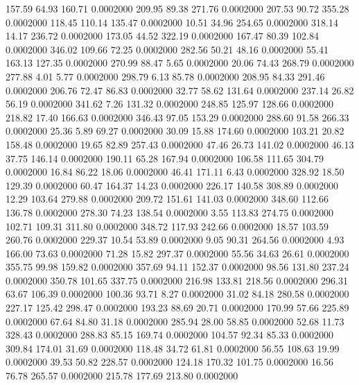  157.59   64.93  160.71   0.0002000
 209.95   89.38  271.76   0.0002000
 207.53   90.72  355.28   0.0002000
 118.45  110.14  135.47   0.0002000
  10.51   34.96  254.65   0.0002000
 318.14   14.17  236.72   0.0002000
 173.05   44.52  322.19   0.0002000
 167.47   80.39  102.84   0.0002000
 346.02  109.66   72.25   0.0002000
 282.56   50.21   48.16   0.0002000
  55.41  163.13  127.35   0.0002000
 270.99   88.47    5.65   0.0002000
  20.06   74.43  268.79   0.0002000
 277.88    4.01    5.77   0.0002000
 298.79    6.13   85.78   0.0002000
 208.95   84.33  291.46   0.0002000
 206.76   72.47   86.83   0.0002000
  32.77   58.62  131.64   0.0002000
 237.14   26.82   56.19   0.0002000
 341.62    7.26  131.32   0.0002000
 248.85  125.97  128.66   0.0002000
 218.82   17.40  166.63   0.0002000
 346.43   97.05  153.29   0.0002000
 288.60   91.58  266.33   0.0002000
  25.36    5.89   69.27   0.0002000
  30.09   15.88  174.60   0.0002000
 103.21   20.82  158.48   0.0002000
  19.65   82.89  257.43   0.0002000
  47.46   26.73  141.02   0.0002000
  46.13   37.75  146.14   0.0002000
 190.11   65.28  167.94   0.0002000
 106.58  111.65  304.79   0.0002000
  16.84   86.22   18.06   0.0002000
  46.41  171.11    6.43   0.0002000
 328.92   18.50  129.39   0.0002000
  60.47  164.37   14.23   0.0002000
 226.17  140.58  308.89   0.0002000
  12.29  103.64  279.88   0.0002000
 209.72  151.61  141.03   0.0002000
 348.60  112.66  136.78   0.0002000
 278.30   74.23  138.54   0.0002000
   3.55  113.83  274.75   0.0002000
 102.71  109.31  311.80   0.0002000
 348.72  117.93  242.66   0.0002000
  18.57  103.59  260.76   0.0002000
 229.37   10.54   53.89   0.0002000
   9.05   90.31  264.56   0.0002000
   4.93  166.00   73.63   0.0002000
  71.28   15.82  297.37   0.0002000
  55.56   34.63   26.61   0.0002000
 355.75   99.98  159.82   0.0002000
 357.69   94.11  152.37   0.0002000
  98.56  131.80  237.24   0.0002000
 350.78  101.65  337.75   0.0002000
 216.98  133.81  218.56   0.0002000
 296.31   63.67  106.39   0.0002000
 100.36   93.71    8.27   0.0002000
  31.02   84.18  280.58   0.0002000
 227.17  125.42  298.47   0.0002000
 193.23   88.69   20.71   0.0002000
 170.99   57.66  225.89   0.0002000
  67.64   84.80   31.18   0.0002000
 285.94   28.00   58.85   0.0002000
  52.68   11.73  328.43   0.0002000
 288.83   85.15  169.74   0.0002000
 104.57   92.34   85.33   0.0002000
 309.84  174.01   31.69   0.0002000
 118.48   34.72   61.81   0.0002000
  56.55  108.63   19.99   0.0002000
  39.53   50.82  228.57   0.0002000
 124.18  170.32  101.75   0.0002000
  16.56   76.78  265.57   0.0002000
 215.78  177.69  213.80   0.0002000
